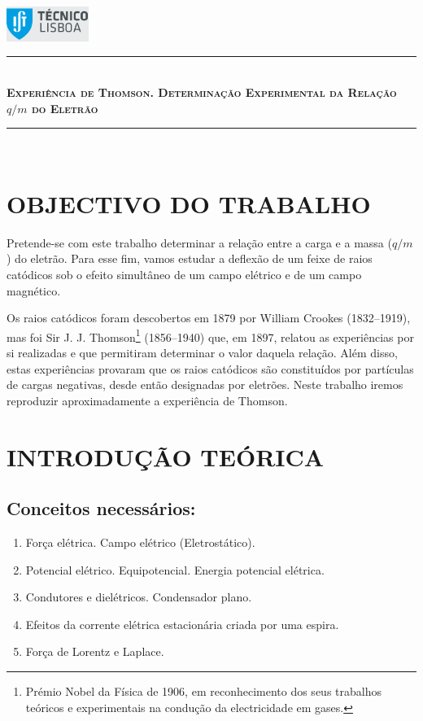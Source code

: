 \documentclass[a4paper,twoside,12pt]{article}      %
\author{Prof. Bernardo B. Carvalho}
\date{ Setembro 2014}
\newcommand{\HRule}{\rule{\linewidth}{0.5mm}}
\begin{document}
 

\includegraphics[width=0.2\textwidth]{../logo-ist}%

\HRule \\[0.5cm]
{ \large   \bfseries \textsc{ Experiência de Thomson. Determinação Experimental da Relação $q/m$ do Eletrão }}\\
\HRule \\%

\section{\sf OBJECTIVO DO TRABALHO}
Pretende-se com este trabalho determinar a relação entre a carga e a massa ($q/m$) do eletrão. Para esse fim, vamos estudar a deflexão de um feixe de raios catódicos sob o efeito simultâneo de um campo elétrico e de um campo magnético.

Os raios catódicos foram descobertos em 1879 por William Crookes (1832--1919), mas foi Sir J. J. Thomson\footnote{Prémio Nobel da Física de 1906, em reconhecimento dos seus trabalhos teóricos e experimentais na condução da electricidade em gases.} (1856--1940) que, em 1897, relatou as experiências por si realizadas e que permitiram determinar o valor daquela relação. Além disso, estas experiências provaram que os raios catódicos são constituídos por partículas de cargas negativas, desde então designadas por eletrões. Neste trabalho iremos reproduzir aproximadamente a experiência de Thomson.

\section{\sf INTRODUÇÃO TEÓRICA}
\subsection{\sf  Conceitos necessários:} 
\begin{enumerate}
	\item Força elétrica. Campo elétrico (Eletrostático).
	\item Potencial elétrico. Equipotencial. Energia potencial elétrica.
	\item Condutores e dielétricos. Condensador plano.
	\item Efeitos da corrente elétrica estacionária criada por uma espira. 	
	\item Força de Lorentz e Laplace.
\end{enumerate}
\end{document}
